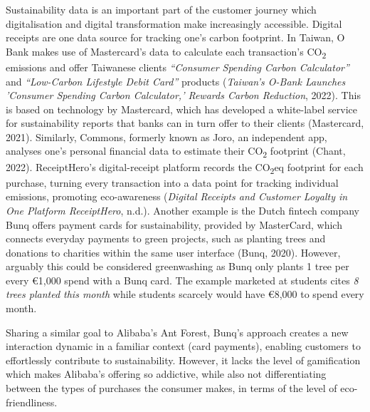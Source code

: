 \documentclass[
  12pt,
  letterpaper,
  DIV=11,
  numbers=noendperiod]{scrartcl}
\begin{document}
Sustainability data is an important part of the customer journey which
digitalisation and digital transformation make increasingly accessible.
Digital receipts are one data source for tracking one's carbon
footprint. In Taiwan, O Bank makes use of Mastercard's data to calculate
each transaction's CO\textsubscript{2} emissions and offer Taiwanese
clients \emph{``Consumer Spending Carbon Calculator''} and
\emph{``Low-Carbon Lifestyle Debit Card''} products (\emph{Taiwan's
{O-Bank} Launches '{Consumer Spending Carbon Calculator},' Rewards
Carbon Reduction}, 2022). This is based on technology by Mastercard,
which has developed a white-label service for sustainability reports
that banks can in turn offer to their clients (Mastercard, 2021).
Similarly, Commons, formerly known as Joro, an independent app, analyses
one's personal financial data to estimate their CO\textsubscript{2}
footprint (Chant, 2022). ReceiptHero's digital-receipt platform records
the CO\textsubscript{2}eq footprint for each purchase, turning every
transaction into a data point for tracking individual emissions,
promoting eco-awareness (\emph{Digital Receipts and Customer Loyalty in
One Platform {\textbar} {ReceiptHero}}, n.d.). Another example is the
Dutch fintech company Bunq offers payment cards for sustainability,
provided by MasterCard, which connects everyday payments to green
projects, such as planting trees and donations to charities within the
same user interface (Bunq, 2020). However, arguably this could be
considered greenwashing as Bunq only plants 1 tree per every €1,000
spend with a Bunq card. The example marketed at students cites \emph{8
trees planted this month} while students scarcely would have €8,000 to
spend every month.

Sharing a similar goal to Alibaba's Ant Forest, Bunq's approach creates
a new interaction dynamic in a familiar context (card payments),
enabling customers to effortlessly contribute to sustainability.
However, it lacks the level of gamification which makes Alibaba's
offering so addictive, while also not differentiating between the types
of purchases the consumer makes, in terms of the level of
eco-friendliness.
\end{document}
